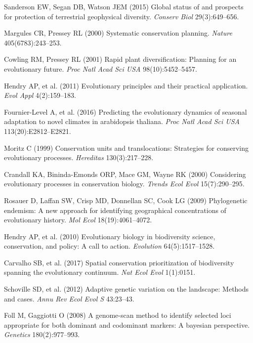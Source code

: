 \documentclass[9pt,twocolumn,twoside,lineno]{pnas-new}
\begin{document}
\showmatmethods
\showacknow
\pnasbreak

\begin{thebibliography}{100}
Sanderson EW, Segan DB, Watson JEM (2015) Global status of and
prospects for protection of terrestrial geophysical diversity.
\emph{Conserv Biol} 29(3):649--656.

Margules CR, Pressey RL (2000) Systematic conservation planning.
\emph{Nature} 405(6783):243--253.

Cowling RM, Pressey RL (2001) Rapid plant diversification: Planning
for an evolutionary future. \emph{Proc Natl Acad Sci USA}
98(10):5452--5457.

Hendry AP, et al. (2011) Evolutionary principles and their practical
application. \emph{Evol Appl} 4(2):159--183.

Fournier-Level A, et al. (2016) Predicting the evolutionary dynamics
of seasonal adaptation to novel climates in arabidopsis thaliana.
\emph{Proc Natl Acad Sci USA} 113(20):E2812--E2821.

Moritz C (1999) Conservation units and translocations: Strategies for
conserving evolutionary processes. \emph{Hereditas} 130(3):217--228.

Crandall KA, Bininda-Emonds ORP, Mace GM, Wayne RK (2000) Considering
evolutionary processes in conservation biology. \emph{Trends Ecol Evol}
15(7):290--295.

Rosauer D, Laffan SW, Crisp MD, Donnellan SC, Cook LG (2009)
Phylogenetic endemism: A new approach for identifying geographical
concentrations of evolutionary history. \emph{Mol Ecol}
18(19):4061--4072.

Hendry AP, et al. (2010) Evolutionary biology in biodiversity
science, conservation, and policy: A call to action. \emph{Evolution}
64(5):1517--1528.

Carvalho SB, et al. (2017) Spatial conservation prioritization of
biodiversity spanning the evolutionary continuum. \emph{Nat Ecol Evol}
1(1):0151.

Schoville SD, et al. (2012) Adaptive genetic variation on the
landscape: Methods and cases. \emph{Annu Rev Ecol Evol S} 43:23--43.

Foll M, Gaggiotti O (2008) A genome-scan method to identify selected
loci appropriate for both dominant and codominant markers: A bayesian
perspective. \emph{Genetics} 180(2):977--993.


\end{thebibliography}
\end{document}
